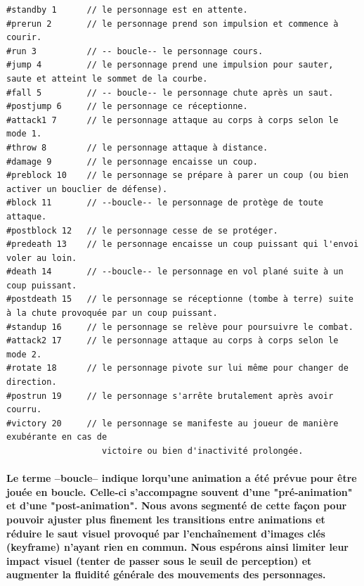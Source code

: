 \begin{scriptsize}\begin{verbatim}
#standby 1      // le personnage est en attente.
#prerun 2       // le personnage prend son impulsion et commence à courir.
#run 3          // -- boucle-- le personnage cours.
#jump 4         // le personnage prend une impulsion pour sauter, saute et atteint le sommet de la courbe.
#fall 5         // -- boucle-- le personnage chute après un saut.
#postjump 6     // le personnage ce réceptionne.
#attack1 7      // le personnage attaque au corps à corps selon le mode 1.
#throw 8        // le personnage attaque à distance.
#damage 9       // le personnage encaisse un coup.
#preblock 10    // le personnage se prépare à parer un coup (ou bien activer un bouclier de défense).
#block 11       // --boucle-- le personnage de protège de toute attaque.
#postblock 12   // le personnage cesse de se protéger.
#predeath 13    // le personnage encaisse un coup puissant qui l'envoi voler au loin.
#death 14       // --boucle-- le personnage en vol plané suite à un coup puissant.
#postdeath 15   // le personnage se réceptionne (tombe à terre) suite à la chute provoquée par un coup puissant.
#standup 16     // le personnage se relève pour poursuivre le combat.
#attack2 17     // le personnage attaque au corps à corps selon le mode 2.
#rotate 18      // le personnage pivote sur lui même pour changer de direction.
#postrun 19     // le personnage s'arrête brutalement après avoir courru.
#victory 20     // le personnage se manifeste au joueur de manière exubérante en cas de
                   victoire ou bien d'inactivité prolongée. 
\end{verbatim}\end{scriptsize}

\paragraph{Le terme --boucle-- indique lorqu'une animation a été prévue pour être jouée en boucle. Celle-ci s'accompagne souvent d'une "\textbf{pré-animation}" et d'une "\textbf{post-animation}". Nous avons segmenté de cette façon pour pouvoir ajuster plus finement les transitions entre animations et réduire le saut visuel provoqué par l'enchaînement d'images clés (keyframe) n'ayant rien en commun. Nous espérons ainsi limiter leur impact visuel (tenter de passer sous le seuil de perception) et augmenter la fluidité générale des mouvements des personnages.}




